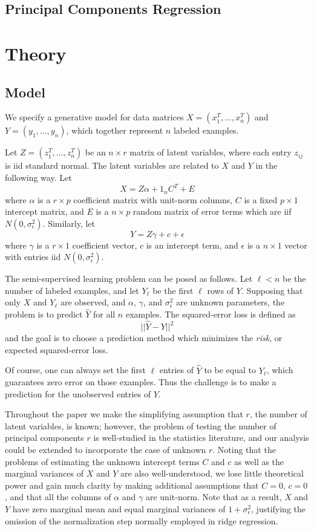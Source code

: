 \documentclass[11pt]{article}
\begin{document}
\subsection{Principal Components Regression}

\section{Theory}

\subsection{Model}

We specify a generative model for data matrices $X = (x_1^T,\hdots,x_n^T)$ and $Y = (y_1, \hdots, y_n)$, which
together represent $n$ labeled examples.

Let $Z = (z_1^T,\hdots,z_n^T)$ be an $n \times r$ matrix of latent variables, where each
entry $z_{ij}$ is iid standard normal.  The latent variables are
related to $X$ and $Y$ in the following way.  Let
\[
X = Z\alpha + 1_n C^T + E
\]
where $\alpha$ is a $r \times p$ coefficient matrix with unit-norm
columns, $C$ is a fixed $p \times 1 $ intercept matrix, and $E$ is a
$n \times p$ random matrix of error terms which are iif $N(0,
\sigma_\epsilon^2)$.  Similarly, let
\[
Y = Z\gamma + c + \epsilon
\]
where $\gamma$ is a $r \times 1$ coefficient vector, $c$ is an
intercept term, and $\epsilon$ is a $n \times 1$ vector with entries
iid $N(0, \sigma^2_\epsilon)$.

The semi-supervised learning problem can be posed as follows.  Let
$\ell < n$ be the number of labeled examples, and let $Y_\ell$ be the
first $\ell$ rows of $Y$.  Supposing that only $X$ and $Y_\ell$ are
observed, and $\alpha$, $\gamma$, and $\sigma^2_\epsilon$ are unknown
parameters, the problem is to predict $\hat{Y}$ for all $n$ examples.
The squared-error loss is defined as
\[
||\hat{Y} - Y||^2
\]
and the goal is to choose a prediction method which minimizes the
\emph{risk}, or expected squared-error loss.

Of course, one can always set the first $\ell$ entries of $\hat{Y}$ to be
equal to $Y_\ell$, which guarantees zero error on those examples.  Thus the
challenge is to make a prediction for the unobserved entries of $Y$.

Throughout the paper we make the simplifying assumption that $r$, the
number of latent variables, is known; however, the problem of testing
the number of principal components $r$ is well-studied in the
statistics literature, and our analysis could be extended to
incorporate the case of unknown $r$.  Noting that the problems of
estimating the unknown intercept terms $C$ and $c$ as well as the
marginal variances of $X$ and $Y$ are also well-understood, we lose
little theoretical power and gain much clarity by making additional
assumptions that $C=0$, $c=0$, and that all the columns of $\alpha$
and $\gamma$ are unit-norm.  Note that as a result, $X$ and $Y$ have
zero marginal mean and equal marginal variances of $1 +
\sigma_\epsilon^2$, justifying the omission of the normalization step
normally employed in ridge regression.
\end{document}
